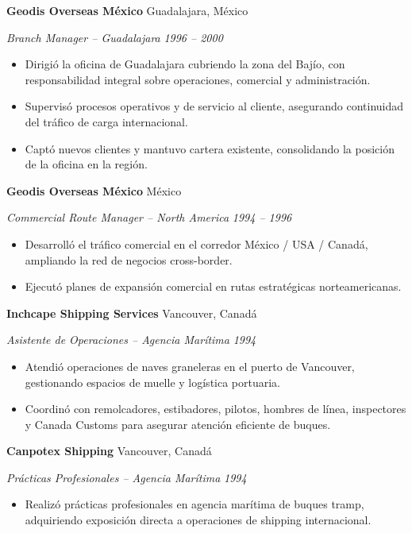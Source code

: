 \documentclass[11pt,letterpaper]{article}
\newcommand{\entry}[4]{%
  \noindent\textbf{#1} \hfill #2 \par\nopagebreak
  \textit{#3} \hfill \textit{#4} \par\nopagebreak
}
\begin{document}
\entry{Geodis Overseas México}{Guadalajara, México}{Branch Manager -- Guadalajara}{1996 -- 2000}
\begin{itemize}
  \item Dirigió la oficina de Guadalajara cubriendo la zona del Bajío, con responsabilidad integral sobre operaciones, comercial y administración.
  \item Supervisó procesos operativos y de servicio al cliente, asegurando continuidad del tráfico de carga internacional.
  \item Captó nuevos clientes y mantuvo cartera existente, consolidando la posición de la oficina en la región.
\end{itemize}
\vspace{0.3em}

\entry{Geodis Overseas México}{México}{Commercial Route Manager -- North America}{1994 -- 1996}
\begin{itemize}
  \item Desarrolló el tráfico comercial en el corredor México / USA / Canadá, ampliando la red de negocios cross-border.
  \item Ejecutó planes de expansión comercial en rutas estratégicas norteamericanas.
\end{itemize}
\vspace{0.3em}

\entry{Inchcape Shipping Services}{Vancouver, Canadá}{Asistente de Operaciones -- Agencia Marítima}{1994}
\begin{itemize}
  \item Atendió operaciones de naves graneleras en el puerto de Vancouver, gestionando espacios de muelle y logística portuaria.
  \item Coordinó con remolcadores, estibadores, pilotos, hombres de línea, inspectores y Canada Customs para asegurar atención eficiente de buques.
\end{itemize}
\vspace{0.3em}

\entry{Canpotex Shipping}{Vancouver, Canadá}{Prácticas Profesionales -- Agencia Marítima}{1994}
\begin{itemize}
  \item Realizó prácticas profesionales en agencia marítima de buques tramp, adquiriendo exposición directa a operaciones de shipping internacional.
\end{itemize}
\vspace{0.3em}

\end{document}
